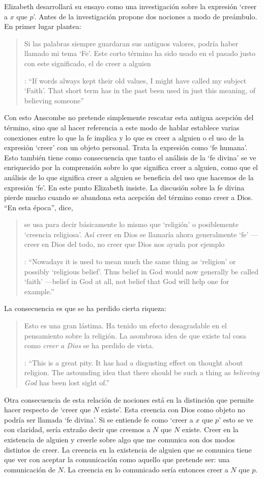 Elizabeth desarrollará su ensayo como una investigación sobre la expresión \enquote*{creer a $x$ que $p$}. Antes de la investigación propone dos nociones a modo de preámbulo. En primer lugar plantea: \blockquote[{\cite[1]{anscombe2008faith:tobelieve}}: \enquote{If words always kept their old values, I might have called my subject `Faith'. That short term has in the past been used in just this meaning, of believing someone}]{Si las palabras siempre guardaran sus antiguos valores, podría haber llamado mi tema `Fe'. Este corto término ha sido usado en el pasado justo con este significado, el de creer a alguien}. Con esto Anscombe no pretende simplemente rescatar esta antigua acepción del término, sino que al hacer referencia a este modo de hablar establece varias conexiones entre lo que la fe implica y lo que es creer a alguien o el uso de la expresión `creer' con un objeto personal. Trata la expresión como `fe humana'. Esto también tiene como consecuencia que tanto el análisis de la `fe divina' se ve enriquecido por la comprensión sobre lo que significa creer a alguien, como que el análisis de lo que significa creer a alguien se beneficia del uso que hacemos de la expresión `fe'. En este punto Elizabeth insiste. La discusión sobre la fe divina pierde mucho cuando se abandona esta acepción del término como creer a Dios. \enquote{En esta época}, dice, \blockquote[{\cite{anscombe2008faith:tobelieve}}: \enquote{Nowadays it is used to mean much the same thing as `religion' or possibly `religious belief'. Thus belief in God would now generally be called `faith' ---belief in God at all, not belief that God will help one for example.}]{se usa para decir básicamente lo mismo que `religión' o posiblemente `creencia religiosa'. Así creer en Dios se llamaría ahora generalmente `fe' ---creer en Dios del todo, no creer que Dios nos ayuda por ejemplo}. La consecuencia es que se ha perdido cierta riqueza: \blockquote[{\cite{anscombe2008faith:tobelieve}}: \enquote{This is a great pity. It has had a disgusting effect on thought about religion. The astounding idea that there should be such a thing as \emph{believing God} has been lost sight of.}]{Esto es una gran lástima. Ha tenido un efecto desagradable en el pensamiento sobre la religión. La asombrosa idea de que existe tal cosa como \emph{creer a Dios} se ha perdido de vista.}

Otra consecuencia de esta relación de nociones está en la distinción que permite hacer respecto de \enquote*{creer que $N$ existe}. Esta creencia con Dios como objeto no podría ser llamada `fe divina'. Si se entiende fe como \enquote*{creer a $x$ que $p$} esto se ve con claridad, sería extraño decir que creemos a $N$ que $N$ existe. Creer en la existencia de alguien y creerle sobre algo que me comunica son dos modos distintos de creer. La creencia en la existencia de alguien que se comunica tiene que ver con aceptar la comunicación como aquello que pretende ser: una comunicación de $N$. La creencia en lo comunicado sería entonces creer a $N$ que $p$.


